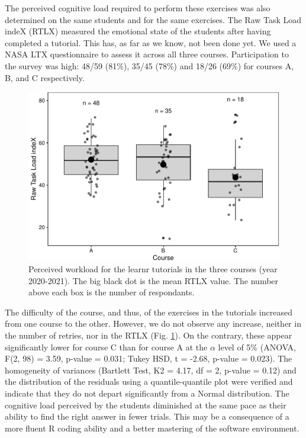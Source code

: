 \documentclass{aims}
\theoremstyle{definition}
\begin{document}
The perceived cognitive load required to perform these exercises was
also determined on the same students and for the same exercises. The Raw
Task Load indeX (RTLX) measured the emotional state of the students
after having completed a tutorial. This has, as far as we know, not been
done yet. We used a NASA LTX questionnaire to assess it across all three
courses. Participation to the survey was high: 48/59 (81\%), 35/45
(78\%) and 18/26 (69\%) for courses A, B, and C respectively.

\begin{figure}
\includegraphics[width=1\linewidth]{teaching_data_science_files/figure-latex/fig_rtlx-1} \caption{\label{fig:fig_rtlx} Perceived workload for the learnr tutorials in the three courses (year 2020-2021). The big black dot is the mean RTLX value. The number above each box is the number of respondants.}\label{fig:fig_rtlx}
\end{figure}

The difficulty of the course, and thus, of the exercises in the
tutorials increased from one course to the other. However, we do not
observe any increase, neither in the number of retries, nor in the RTLX
(Fig. \ref {fig:fig_rtlx}). On the contrary, these appear significantly
lower for course C than for course A at the \(\alpha\) level of 5\%
(ANOVA, F(2, 98) = 3.59, p-value = 0.031; Tukey HSD, t = -2.68, p-value
= 0.023). The homogeneity of variances (Bartlett Test, K2 = 4.17, df =
2, p-value = 0.12) and the distribution of the residuals using a
quantile-quantile plot were verified and indicate that they do not
depart significantly from a Normal distribution. The cognitive load
perceived by the students diminished at the same pace as their ability
to find the right answer in fewer trials. This may be a consequence of a
more fluent R coding ability and a better mastering of the software
environment.
\end{document}
